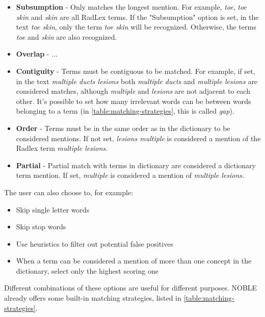 \begin{itemize}

\item \textbf{Subsumption} - Only matches the longest mention. For example, \textit{toe}, \textit{toe skin} and \textit{skin} are all RadLex terms. If the "Subsumption" option is set, in the text \textit{toe skin}, only the term \textit{toe skin} will be recognized. Otherwise, the terms \textit{toe} and \textit{skin} are also recognized.

\item \textbf{Overlap} - ...

\item \textbf{Contiguity} - Terms must be contiguous to be matched. For example, if set, in the text \textit{multiple ducts lesions} both \textit{multiple ducts} and \textit{multiple lesions} are considered matches, although \textit{multiple} and \textit{lesions} are not adjacent to each other. It's possible to set how many irrelevant words can be between words belonging to a term (in \ref{table:matching-strategies}, this is called \textit{gap}). 

\item \textbf{Order} - Terms must be in the same order as in the dictionary to be considered mentions. If not set, \textit{lesions multiple} is considered a mention of the Radlex term \textit{multiple lesions}.

\item \textbf{Partial} - Partial match with terms in dictionary are considered a dictionary term mention. If set, \textit{multiple} is considered a mention of \textit{multiple lesions}. 

\end{itemize}

The user can also choose to, for example:

\begin{itemize}
\item Skip single letter words
\item Skip stop words
\item Use heuristics to filter out potential false positives
\item When a term can be considered a mention of more than one concept in the dictionary,  select only the highest scoring one
\end{itemize}

Different combinations of these options are useful for different purposes. NOBLE already offers some built-in matching strategies, listed in \ref{table:matching-strategies}. 

